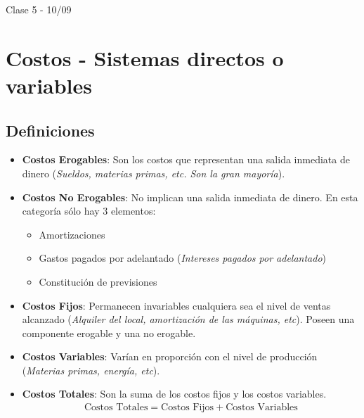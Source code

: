 \documentclass[12pt,a4paper]{article}
\begin{document}
        

\newpage

Clase 5 - 10/09 \hrulefill

\section{Costos - Sistemas directos o variables}

	\subsection{Definiciones}
    
    \begin{itemize}
    	\item	\textbf{Costos Erogables}: Son los costos que representan una salida inmediata de dinero (\textsl{Sueldos, materias primas, etc. Son la gran mayoría}).
        
        \item	\textbf{Costos No Erogables}: No implican una salida inmediata de dinero.
        		En esta categoría sólo hay 3 elementos:
                \begin{itemize}
					\item	Amortizaciones
                    \item	Gastos pagados por adelantado (\textsl{Intereses pagados por adelantado})
                    \item	Constitución de previsiones
				\end{itemize}
		
        \item	\textbf{Costos Fijos}: Permanecen invariables cualquiera sea el nivel de ventas alcanzado (\textsl{Alquiler del local, amortización de las máquinas, etc}).
        		Poseen una componente erogable y una no erogable.
        
        \item	\textbf{Costos Variables}: Varían en proporción con el nivel de producción (\textsl{Materias primas, energía, etc}).
        
        \item	\textbf{Costos Totales}: Son la suma de los costos fijos y los costos variables.
        		\begin{align}
                	\text{Costos Totales} = \text{Costos Fijos} + \text{Costos Variables}
                    \label{Costos_totales}
				\end{align}
        

\end{itemize}
\end{document}
